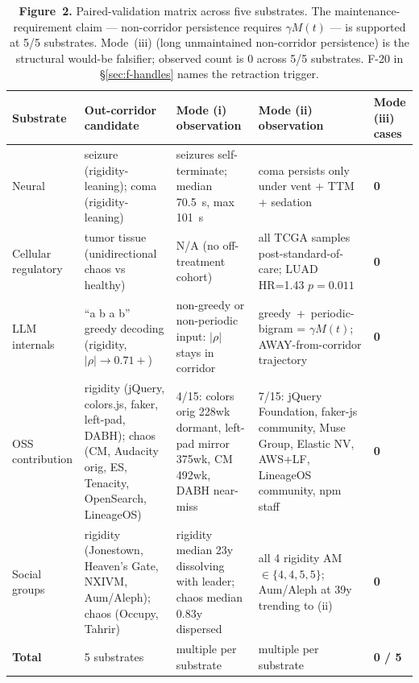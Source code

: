 \documentclass[11pt,a4paper]{article}
\begin{document}
\begin{table}[h]
\centering
\small
\renewcommand{\arraystretch}{1.2}
\begin{tabular}{@{}p{2.2cm}p{2.5cm}p{2.8cm}p{2.8cm}p{2.5cm}@{}}
\toprule
\textbf{Substrate} & \textbf{Out-corridor candidate} & \textbf{Mode (i) observation} & \textbf{Mode (ii) observation} & \textbf{Mode (iii) cases} \\
\midrule
Neural & seizure (rigidity-leaning); coma (rigidity-leaning) & seizures self-terminate; median 70.5~s, max 101~s & coma persists only under vent + TTM + sedation & \textbf{0} \\
Cellular regulatory & tumor tissue (unidirectional chaos vs healthy) & N/A (no off-treatment cohort) & all TCGA samples post-standard-of-care; LUAD HR=1.43 $p=0.011$ & \textbf{0} \\
LLM internals & ``a b a b'' greedy decoding (rigidity, $|\rho| \to 0.71+$) & non-greedy or non-periodic input: $|\rho|$ stays in corridor & greedy~+~periodic-bigram = $\gamma M(t)$; AWAY-from-corridor trajectory & \textbf{0} \\
OSS contribution & rigidity (jQuery, colors.js, faker, left-pad, DABH); chaos (CM, Audacity orig, ES, Tenacity, OpenSearch, LineageOS) & 4/15: colors orig 228wk dormant, left-pad mirror 375wk, CM 492wk, DABH near-miss & 7/15: jQuery Foundation, faker-js community, Muse Group, Elastic NV, AWS+LF, LineageOS community, npm staff & \textbf{0} \\
Social groups & rigidity (Jonestown, Heaven's Gate, NXIVM, Aum/Aleph); chaos (Occupy, Tahrir) & rigidity median 23y dissolving with leader; chaos median 0.83y dispersed & all 4 rigidity AM $\in \{4,4,5,5\}$; Aum/Aleph at 39y trending to (ii) & \textbf{0} \\
\midrule
\textbf{Total} & 5 substrates & multiple per substrate & multiple per substrate & \textbf{0 / 5} \\
\bottomrule
\end{tabular}
\caption{\textbf{Figure~2.} Paired-validation matrix across five substrates. The maintenance-requirement claim --- non-corridor persistence requires $\gamma M(t)$ --- is supported at 5/5 substrates. Mode~(iii) (long unmaintained non-corridor persistence) is the structural would-be falsifier; observed count is 0 across 5/5 substrates. F-20 in \S\ref{sec:f-handles} names the retraction trigger.}
\label{fig:paired-validation}
\end{table}
\end{document}
